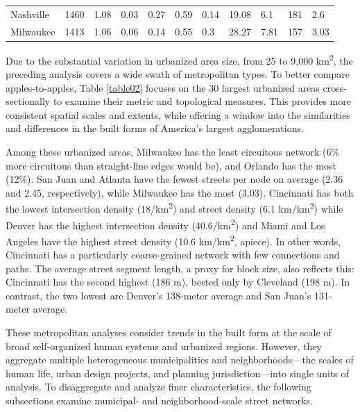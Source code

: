 \documentclass{article}
\begin{document}
\begin{landscape}
\begin{table}
\begin{tabular}{p{2.5cm} p{1.5cm} p{1.5cm} p{1.5cm} p{1.55cm} p{1.5cm} p{1.5cm} p{1.5cm} p{1.5cm} p{1.5cm} p{1.5cm}}
Nashville            & 1460          & 1.08         & 0.03                       & 0.27           & 0.59        & 0.14        & 19.08                 & 6.1                   & 181                   & 2.6              \\
Milwaukee            & 1413          & 1.06         & 0.06                       & 0.14           & 0.55        & 0.3         & 28.27                 & 7.81                  & 157                   & 3.03 \\
\bottomrule
\end{tabular}
\end{table}
\end{landscape}
\restoregeometry

Due to the substantial variation in urbanized area size, from 25 to 9,000 km\textsuperscript{2}, the preceding analysis covers a wide swath of metropolitan types. To better compare apples-to-apples, Table \ref{table02} focuses on the 30 largest urbanized areas cross-sectionally to examine their metric and topological measures. This provides more consistent spatial scales and extents, while offering a window into the similarities and differences in the built forms of America's largest agglomerations. 

Among these urbanized areas, Milwaukee has the least circuitous network (6\% more circuitous than straight-line edges would be), and Orlando has the most (12\%). San Juan and Atlanta have the fewest streets per node on average (2.36 and 2.45, respectively), while Milwaukee has the most (3.03). Cincinnati has both the lowest intersection density (18/km\textsuperscript{2}) and street density (6.1 km/km\textsuperscript{2}) while Denver has the highest intersection density (40.6/km\textsuperscript{2}) and Miami and Los Angeles have the highest street density (10.6 km/km\textsuperscript{2}, apiece). In other words, Cincinnati has a particularly coarse-grained network with few connections and paths. The average street segment length, a proxy for block size, also reflects this: Cincinnati has the second highest (186 m), bested only by Cleveland (198 m). In contrast, the two lowest are Denver's 138-meter average and San Juan's 131-meter average.

These metropolitan analyses consider trends in the built form at the scale of broad self-organized human systems and urbanized regions. However, they aggregate multiple heterogeneous municipalities and neighborhoods---the scales of human life, urban design projects, and planning jurisdiction---into single units of analysis. To disaggregate and analyze finer characteristics, the following subsections examine municipal- and neighborhood-scale street networks.
\end{document}
